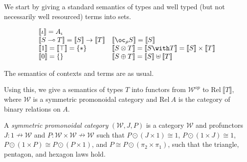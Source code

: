 We start by giving a standard semantics of types and well typed (but not necessarily well resourced) terms into sets.

\begin{displaymath}
  \begin{array}{ll}
    \llbracket \base \rrbracket = A_\base \\
    \llbracket \fun{S}{T} \rrbracket = \llbracket S \rrbracket \rightarrow \llbracket T \rrbracket &
    \llbracket \excl{\rho}{S} \rrbracket = \llbracket S \rrbracket \\
    \llbracket \tensorOne \rrbracket = \llbracket \withTOne \rrbracket = \{*\} &
    \llbracket \tensor{S}{T} \rrbracket = \llbracket \withT{S}{T} \rrbracket = \llbracket S \rrbracket \times \llbracket T \rrbracket \\
    \llbracket \sumTZero \rrbracket = \{\} &
    \llbracket \sumT{S}{T} \rrbracket = \llbracket S \rrbracket \uplus \llbracket T \rrbracket \\
  \end{array}
\end{displaymath}

The semantics of contexts and terms are as usual.

Using this, we give a semantics of types $T$ into functors from $\mathcal{W}^{op}$ to $\mathrm{Rel}~\llbracket T \rrbracket$, where $\mathcal{W}$ is a symmetric promonoidal category and $\mathrm{Rel}~A$ is the category of binary relations on $A$.

\begin{definition}
  A \emph{symmetric promonoidal category} $(\mathcal{W}, J, P)$ is a category
  $\mathcal{W}$ and profunctors $J : 1 \nrightarrow \mathcal{W}$ and $P :
  \mathcal{W} \times \mathcal{W} \nrightarrow \mathcal{W}$ such that $P \odot (J
  \times 1) \cong 1$, $P \odot (1 \times J) \cong 1$, $P \odot (1 \times P)
  \cong P \odot (P \times 1)$, and $P \cong P \odot (\pi_2 \times \pi_1)$, such
  that the triangle, pentagon, and hexagon laws hold.
\end{definition}

